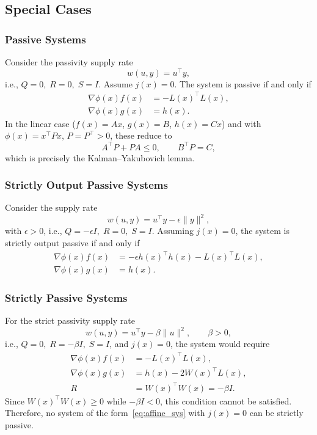 \subsection{Special Cases}

\subsubsection{Passive Systems}
Consider the passivity supply rate
\begin{equation}
w(u,y) = u^\top y,
\end{equation}
i.e., $Q = 0,\; R = 0,\; S = I$.  
Assume $j(x) = 0$.  
The system is passive if and only if
\begin{align}
    \nabla \phi(x) f(x) &= - L(x)^\top L(x), \label{eq:passive_f}\\
    \nabla \phi(x) g(x) &= h(x). \label{eq:passive_g}
\end{align}
In the linear case ($f(x) = Ax$, $g(x) = B$, $h(x) = Cx$) and with 
$\phi(x) = x^\top P x$, $P = P^\top > 0$, these reduce to
\begin{equation}
A^\top P + P A \le 0, 
\qquad B^\top P = C,
\end{equation}
which is precisely the Kalman–Yakubovich lemma.

\subsubsection{Strictly Output Passive Systems}
Consider the supply rate
\begin{equation}
w(u,y) = u^\top y - \epsilon \|y\|^2,
\end{equation}
with $\epsilon > 0$, i.e., $Q = -\epsilon I,\; R = 0,\; S = I$.  
Assuming $j(x) = 0$, the system is strictly output passive if and only if
\begin{align}
    \nabla \phi(x) f(x) &= - \epsilon h(x)^\top h(x) - L(x)^\top L(x), \\
    \nabla \phi(x) g(x) &= h(x).
\end{align}

\subsubsection{Strictly Passive Systems}
For the strict passivity supply rate
\begin{equation}
w(u,y) = u^\top y - \beta \|u\|^2, \qquad \beta > 0,
\end{equation}
i.e., $Q = 0,\; R = -\beta I,\; S = I$, and $j(x) = 0$, the system would require
\begin{align}
    \nabla \phi(x) f(x) &= - L(x)^\top L(x), \\
    \nabla \phi(x) g(x) &= h(x) - 2 W(x)^\top L(x), \\
    R &= W(x)^\top W(x) = -\beta I.
\end{align}
Since $W(x)^\top W(x) \ge 0$ while $-\beta I < 0$, this condition cannot be satisfied.  
Therefore, no system of the form~\eqref{eq:affine_sys} with $j(x) = 0$ can be strictly passive.
